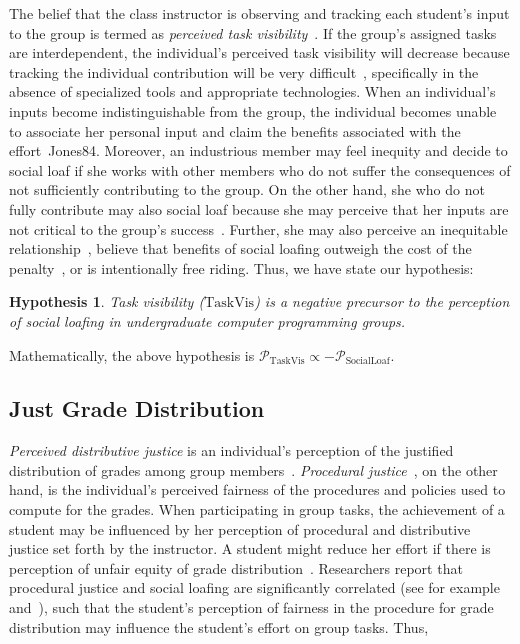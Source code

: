 \documentclass[a4paper,a4paper,BCOR12mm,12pt,abstracton,pointednumbers,tablecaptionabove,footinclude,halfparskip,normalheadings,]{scrartcl}
\newcommand{\PERCEPT}{\mathcal{P}}
\newcommand{\SOCLOAF}{\mathrm{SocialLoaf}}
\newcommand{\TASKVIS}{\mathrm{TaskVis}}
\newtheorem{hypothesis}{Hypothesis}
\begin{document}
The belief that the class instructor is observing and tracking each student's input to the group is termed as {\em perceived task visibility}~\citep{Kidwell93}. If the group's assigned tasks are interdependent, the individual's perceived task visibility will decrease because tracking the individual contribution will be very difficult~\citep{Jones84}, specifically in the absence of specialized tools and appropriate technologies. When an individual's inputs become indistinguishable from the group, the individual becomes unable to associate her personal input and claim the benefits associated with the effort~{Jones84}. Moreover, an industrious member may feel inequity and decide to social loaf if she works with other members who do not suffer the consequences of not sufficiently contributing to the group. On the other hand, she who do not fully contribute may also social loaf because she may perceive that her inputs are not critical to the group's success~\citep{Karau93}. Further, she may also perceive an inequitable relationship~\citep{Walster73}, believe that benefits of social loafing outweigh the cost of the penalty~\citep{Murphy03}, or is intentionally free riding. Thus, we have state our hypothesis:

\begin{hypothesis}
Task visibility ($\TASKVIS$) is a negative precursor to the perception of social loafing in undergraduate computer programming groups.\label{hyp:taskvis}
\end{hypothesis}

Mathematically, the above hypothesis is $\PERCEPT_\TASKVIS \propto -\PERCEPT_\SOCLOAF$.

\subsection{Just Grade Distribution}

{\em Perceived distributive justice} is an individual's perception of the justified distribution of grades among group members~\citep{Liden04}. {\em Procedural justice}~\citep{Greenberg90}, on the other hand, is the individual's perceived fairness of the procedures and policies used to compute for the grades. When participating in group tasks, the achievement of a student may be influenced by her perception of procedural and distributive justice set forth by the instructor. A student might reduce her effort if there is perception of unfair equity of grade distribution~\citep{Kidwell93}. Researchers report that procedural justice and social loafing are significantly correlated (see for example~\citet{Liden04} and~\citet{Karau93}), such that the student's perception of fairness in the procedure for grade distribution may influence the student's effort on group tasks. Thus, 
\end{document}
